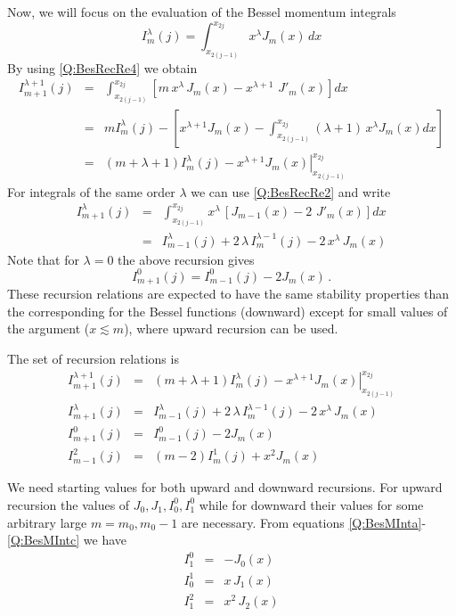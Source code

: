 Now, we will focus on the evaluation of the Bessel momentum integrals
\[
I_{m}^{\lambda}(j) = \int_{x_{2(j-1)}}^{x_{2j}} x^{\lambda} J_{m}(x) \,
d x
\]
By using \ref{Q:BesRecRe4} we obtain
\begin{eqnarray}\label{Q:NMI8}
I_{m+1}^{\lambda+1}(j)  &=& \int_{x_{2(j-1)}}^{x_{2j}}  \left[ m\,
x^{\lambda} \, J_{m}(x) - x^{\lambda+1} \, \,J'_{m}(x)\right] d x
\\
&=& m I_{m}^{\lambda}(j) - \left[ x^{\lambda+1} J_{m}(x) -
\int_{x_{2(j-1)}}^{x_{2j}} (\lambda+1)\, x^{\lambda} J_{m}(x) d x
\right]
\nonumber \\
&=& (m + \lambda+1) I_{m}^{\lambda}(j) - \left. x^{\lambda + 1}
J_{m}(x) \right|_{x_{2(j-1)}}^{x_{2j}}
 \nonumber
\end{eqnarray}
For integrals of the same order $\lambda$ we can use \ref{Q:BesRecRe2}
and write
\begin{eqnarray}\label{Q:NMI9}
I_{m+1}^{\lambda}(j) &=& \int_{x_{2(j-1)}}^{x_{2j}}  x^{\lambda}\,
\left[ J_{m-1}(x) - 2 \, \,J'_{m}(x)\right] d x \nonumber
\\
&=& I_{m-1}^{\lambda}(j) + 2 \, \lambda \, I_{m}^{\lambda-1}(j) - 2\,
x^{\lambda} \, J_{m}(x)
\end{eqnarray}
Note that for $\lambda=0$ the above recursion gives
\[
I^{0}_{m+1}(j) = I^{0}_{m-1}(j) - 2 J_{m}(x) \,.
\]
These recursion relations are expected to have the same stability
properties than the corresponding for the Bessel functions (downward)
except for small values of the argument ($x \lesssim m$), where upward
recursion can be used.

The set of recursion relations is
\begin{eqnarray}\label{Q:NMI10a}
I_{m+1}^{\lambda+1}(j) &=& (m + \lambda+1) I_{m}^{\lambda}(j) - \left.
x^{\lambda + 1} J_{m}(x) \right|_{x_{2(j-1)}}^{x_{2j}}
\\
I^{\lambda}_{m+1}(j)&=& I_{m-1}^{\lambda}(j) + 2 \, \lambda \,
I_{m}^{\lambda-1}(j) - 2\, x^{\lambda} \, J_{m}(x) \label{Q:NMI10b}
\\
I^{0}_{m+1}(j) &=& I^{0}_{m-1}(j) - 2 J_{m}(x) \label{Q:NMI10c}
\\
I_{m-1}^{2}(j) &=& (m - 2) I_{m}^{1}(j) + x^{2} J_{m}(x)
\label{Q:NMI10d}
\end{eqnarray}

We need starting values for both upward and downward recursions. For
upward recursion the values of $J_{0}, J_{1}, I^{0}_{0}, I^{0}_{1}$
while for downward their values for some arbitrary large
$m=m_{0},m_{0}-1$ are necessary. From equations
\ref{Q:BesMInta}-\ref{Q:BesMIntc} \cite[see also][]{Gradsht1980_TOI} we have
%
\begin{eqnarray*}
I_{1}^{0} &=& - J_{0}(x) \nonumber \\
I_{0}^{1} &=& x \, J_{1}(x) \\
I_{1}^{2} &=& x^{2} \, J_{2}(x) \nonumber
\end{eqnarray*}

